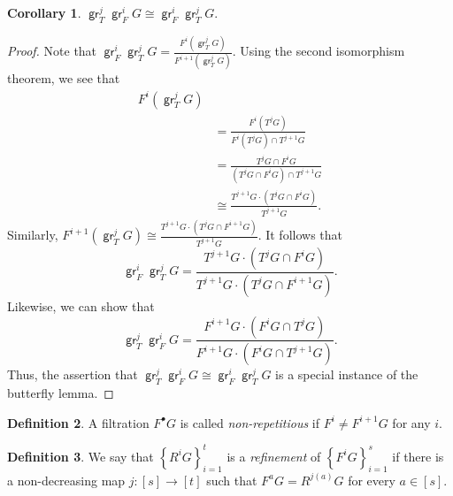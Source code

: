 \documentclass[10pt,letterpaper,cm]{nupset}
\theoremstyle{definition}
\newtheorem{definition}{Definition}[subsection]
\theoremstyle{theorem}
\newtheorem{corollary}[definition]{Corollary}
\theoremstyle{remark}
\newcommand{\1}{\mathbf{1}}
\newcommand{\0}{\vec 0}
\DeclareMathOperator{\gr}{\mathsf{gr}}
\begin{document}
\begin{corollary}
$\gr_T^j\gr_F^i{G} \cong \gr_F^i \gr_T^j{G}$.
\end{corollary}
\begin{proof}
Note that $\gr_F^i \gr_T^j{G} = \frac{F^i(\gr_T^j{G})}{F^{i+1}(\gr_T^j{G})}$. 
Using the second isomorphism theorem, we see that 
\begin{align*}
F^i(\gr_T^j{G}) \\ & = \frac{F^i(T^j{G})}{F^i(T^j{G}) \cap T^{j+1}{G}} 
\\ & = \frac{T^j{G} \cap F^i{G}}{(T^j{G} \cap F^i{G}) \cap T^{j+1}{G}} 
\\ & \cong \frac{T^{j+1}{G} \cdot (T^j{G} \cap F^i{G})}{T^{j+1}{G}} .
\end{align*} 
Similarly, $F^{i+1}(\gr_T^j{G}) \cong \frac{T^{j+1}{G} \cdot (T^j{G} \cap F^{i+1}{G})}{T^{j+1}{G}}.$ 
It follows that $$\gr_F^i \gr_T^j{G} = \frac{T^{j+1}{G} \cdot (T^j{G} \cap F^{i}{G})}{T^{j+1}{G} \cdot (T^j{G} \cap F^{i+1}{G})}.$$
Likewise, we can show that
$$\gr_T^j \gr_F^i{G} = \frac{F^{i+1}{G} \cdot (F^i{G} \cap T^{j}{G})}{F^{i+1}{G} \cdot (F^i{G} \cap T^{j+1}{G})}.$$ Thus, the assertion that $\gr_T^j\gr_F^i{G} \cong \gr_F^i \gr_T^j{G}$ is a special instance of the butterfly lemma. 
\end{proof}

\begin{definition}
A filtration $F^{\bullet}G$ is called \textit{non-repetitious} if $F^i \ne F^{i+1}G$ for any $i$. 
\end{definition}

\begin{definition}
We say that $\left\{R^iG\right\}_{i=1}^t$ is a \textit{refinement} of $\left\{F^iG\right\}_{i=1}^s$ if there is a non-decreasing map $j : [s] \to \left[t\right]$ such that $F^aG = R^{j(a)}G $ for every $a \in [s]$.
\end{definition}
\end{document}
